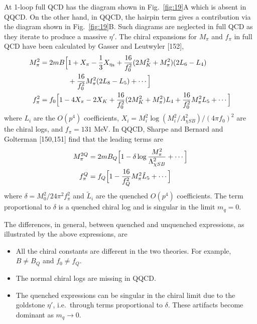 At 1-loop full QCD has the diagram shown in Fig.~\ref{fig:19}A which is absent in QQCD. On the other hand, in QQCD, the hairpin term gives a contribution via the diagram shown in Fig.~\ref{fig:19}B. Such diagrams are neglected in full QCD as they iterate to produce a massive $\eta'$. The chiral expansions for $M_\pi$ and $f_\pi$ in full QCD have been calculated by Gasser and Leutwyler [152],
\begin{equation}
\begin{aligned}
M_\pi^2 &= 2mB\Bigl[1 + X_\pi - \frac{1}{3} X_{\eta_8} + \frac{16}{f_0^2}(2M_K^2 + M_\pi^2)(2L_6 - L_4) \\
&\qquad\qquad + \frac{16}{f_0^2} M_\pi^2 (2L_8 - L_5) + \cdots\Bigr] \\
f_\pi^2 &= f_0\Bigl[1 - 4X_\pi - 2X_K + \frac{16}{f_0^2}(2M_K^2 + M_\pi^2)L_4 + \frac{16}{f_0^2} M_\pi^2 L_5 + \cdots\Bigr]
\end{aligned}
\end{equation}
where $L_i$ are the $O(p^4)$ coefficients, $X_i = M_i^2 \log(M_i^2/\Lambda_{\chi SB}^2)/(4\pi f_0)^2$ are the chiral logs, and $f_\pi = 131$ MeV. In QQCD, Sharpe and Bernard and Golterman [150,151] find that the leading terms are
\begin{equation}
\begin{aligned}
M_\pi^{2Q} &= 2mB_Q\Bigl[1 - \delta \log\frac{M_\pi^2}{\Lambda_{\chi SB}^2} + \cdots\Bigr] \\
f_\pi^Q &= f_Q\Bigl[1 - \frac{16}{f_Q^2} M_\pi^2 \tilde{L}_5 + \cdots\Bigr]
\end{aligned}
\end{equation}
where $\delta = M_0^2 / 24\pi^2 f_\pi^2$ and $\tilde{L}_i$ are the quenched $O(p^4)$ coefficients. The term proportional to $\delta$ is a quenched chiral log and is singular in the limit $m_q = 0$.

The differences, in general, between quenched and unquenched expressions, as illustrated by the above expressions, are
\begin{itemize}
\item All the chiral constants are different in the two theories. For example, $B \neq B_Q$ and $f_0 \neq f_Q$.
\item The normal chiral logs are missing in QQCD.
\item The quenched expressions can be singular in the chiral limit due to the goldstone $\eta'$, i.e.~through terms proportional to $\delta$. These artifacts become dominant as $m_q \to 0$.
\end{itemize}

